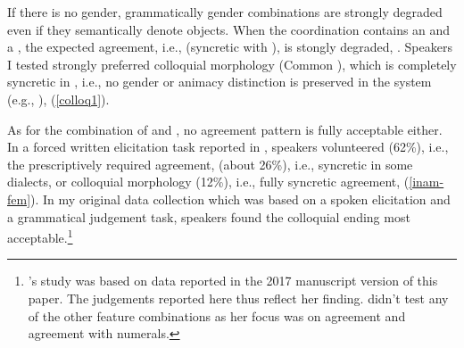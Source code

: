\documentclass[output=paper,modfontsnewtxmath,hidelinks]{langscibook}
\begin{document}
\noindent If there is no   gender, grammatically  gender combinations are strongly degraded even if they semantically denote  objects. When the coordination contains an    and a , the expected agreement, i.e.,   (syncretic with  ), is stongly degraded, . Speakers I tested strongly preferred colloquial morphology (Common ), which is completely syncretic in , i.e., no gender or animacy distinction is preserved in the system (e.g., \citealt[76]{KarlikEtAl:2002}), (\ref{colloq1}).

\z

\z

As for the combination of  and , no agreement pattern is fully acceptable either. In a forced written elicitation task reported in \citet{Adam:2017}, speakers volunteered   (62\%), i.e., the prescriptively required agreement,   (about 26\%), i.e., syncretic  in some dialects, or colloquial morphology (12\%), i.e., fully syncretic agreement, (\ref{inam-fem}). In my original data collection which was based on a spoken elicitation and a grammatical judgement task, speakers found the colloquial ending most acceptable.\footnote{\citeauthor{Adam:2017}'s study was based on data reported in the 2017 manuscript version of this paper. The judgements reported here thus reflect her finding. \citeauthor{Adam:2017} didn't test any of the other feature combinations as her focus was on  agreement and agreement with numerals.}

\z
\end{document}
